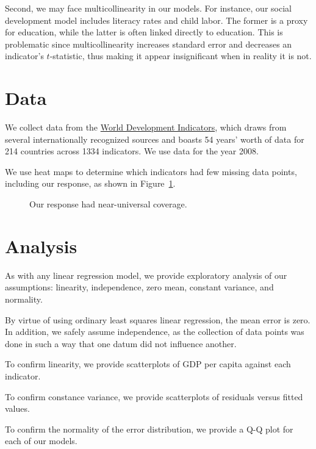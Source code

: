 \documentclass[12pt, twocolumn]{article}
\begin{document}
Second, we may face multicollinearity in our models. For instance, our social development model includes literacy rates and child labor. The former is a proxy for education, while the latter is often linked directly to education. This is problematic since multicollinearity increases standard error and decreases an indicator's $t$-statistic, thus making it appear insignificant when in reality it is not.




\section{Data}
We collect data from the \href{http://data.worldbank.org/indicator}{World Development Indicators}, 
which draws from several internationally recognized sources and boasts 54 years' worth of data for 214 countries across 1334 indicators.
We use data for the year 2008.\endnotemark[1]

We use heat maps to determine which indicators had few missing data points, including our response, as shown in Figure~\ref{gdp_per_capita_heat_map}.

\begin{figure}[h!]
\centering
\caption{\label{gdp_per_capita_heat_map}Our response had near-universal coverage.}
\end{figure}



\section{Analysis}
As with any linear regression model, we provide exploratory analysis of our assumptions: linearity, independence, zero mean, constant variance, and normality.

By virtue of using ordinary least squares linear regression, the mean error is zero. In addition, we safely assume independence, as the collection of data points was done in such a way that one datum did not influence another.

To confirm linearity, we provide scatterplots of GDP per capita against each indicator.

To confirm constance variance, we provide scatterplots of residuals versus fitted values.

To confirm the normality of the error distribution, we provide a Q-Q plot for each of our models.
\end{document}

